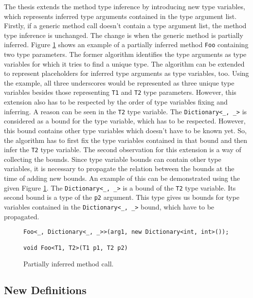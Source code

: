 The thesis extends the method type inference by introducing new type variables, which represents inferred type arguments contained in the type argument list. 
Firstly, if a generic method call doesn’t contain a type argument list, the method type inference is unchanged. The change is when the generic method is partially inferred. 
Figure \ref{img54:partInf} shows an example of a partially inferred method \texttt{Foo} containing two type parameters. 
The former algorithm identifies the type arguments as type variables for which it tries to find a unique type. 
The algorithm can be extended to represent placeholders for inferred type arguments as type variables, too. 
Using the example, all three underscores would be represented as three unique type variables besides those representing \texttt{T1} and \texttt{T2} type parameters. 
However, this extension also has to be respected by the order of type variables fixing and inferring. 
A reason can be seen in the \texttt{T2} type variable. 
The \texttt{Dictionary<\_, \_>} is considered as a bound for the type variable, which has to be respected. 
However, this bound contains other type variables which doesn't have to be known yet. 
So, the algorithm has to first fix the type variables contained in that bound and then infer the \texttt{T2} type variable. 
The second observation for this extension is a way of collecting the bounds. 
Since type variable bounds can contain other type variables, it is necessary to propagate the relation between the bounds at the time of adding new bounds. 
An example of this can be demonstrated using the given Figure \ref{img54:partInf}. 
The \texttt{Dictionary<\_, \_>} is a bound of the \texttt{T2} type variable. 
Its second bound is a type of the \texttt{p2} argument. 
This type gives us bounds for type variables contained in the \texttt{Dictionary<\_, \_>} bound, which have to be propagated.
\begin{figure}[h!]
\begin{lstlisting}[style=csharp]
Foo<_, Dictionary<_, _>>(arg1, new Dictionary<int, int>());

void Foo<T1, T2>(T1 p1, T2 p2)
\end{lstlisting}
\caption{Partially inferred method call.}
\label{img54:partInf}
\end{figure}

\subsection{New Definitions}


